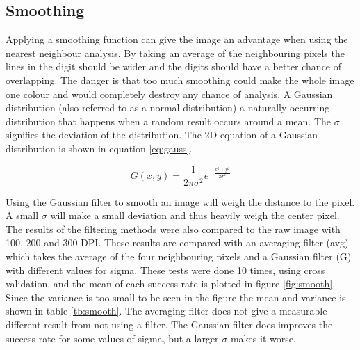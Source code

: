 \subsection{Smoothing}


\begin{figure}[H]
\centering
{}
\end{figure}

Applying a smoothing function can give the image an advantage when using the nearest neighbour analysis.
By taking an average of the neighbouring pixels the lines in the digit should be wider and the digits should have a better chance of overlapping.
The danger is that too much smoothing could make the whole image one colour and would completely destroy any chance of analysis.
A Gaussian distribution (also referred to as a normal distribution) a naturally occurring distribution that happens when a random result occurs around a mean. 
The $\sigma$ signifies the deviation of the distribution. 
The 2D equation of a Gaussian distribution is shown in equation \ref{eq:gauss}. 

\begin{equation}
G(x,y) = \frac{1}{2\pi \sigma^2} e^{- \frac{x^2+y^2}{2\sigma^2}} \label{eq:gauss}
\end{equation}

Using the Gaussian filter to smooth an image will weigh the distance to the pixel.
A small $\sigma$ will make a small deviation and thus heavily weigh the center pixel.
The results of the filtering methods were also compared to the raw image with 100, 200 and 300 DPI.
These results are compared with an averaging filter (avg) which takes the average of the four neighbouring pixels and a Gaussian filter (G) with different values for sigma.
These tests were done 10 times, using cross validation, and the mean of each success rate is plotted in figure \ref{fig:smooth}. 
Since the variance is too small to be seen in the figure the mean and variance is shown in table \ref{tb:smooth}.
The averaging filter does not give a measurable different result from not using a filter.
The Gaussian filter does improves the success rate for some values of sigma, but a larger $\sigma$ makes it worse.

